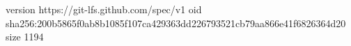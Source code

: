 version https://git-lfs.github.com/spec/v1
oid sha256:200b5865f0ab8b1085f107ca429363dd226793521cb79aa866e41f6826364d20
size 1194
